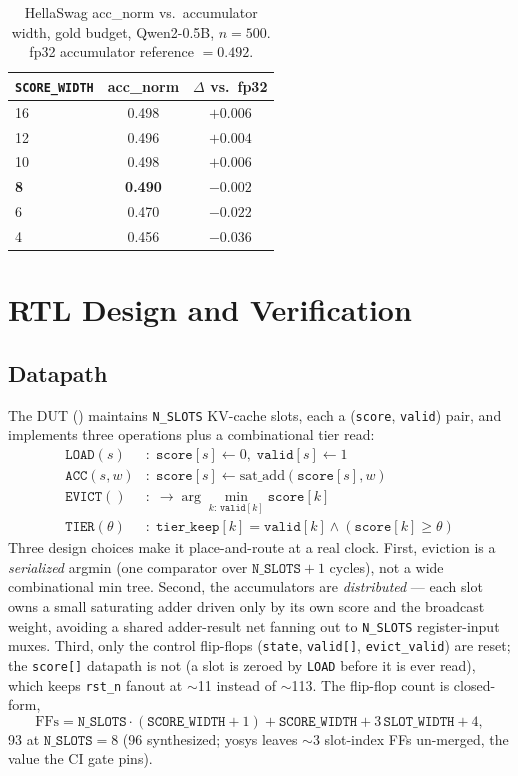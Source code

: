 \documentclass[10pt,twocolumn]{article}
\begin{document}
\begin{table}[tbp]
\centering
\caption{HellaSwag acc\_norm vs.\ accumulator width, gold budget,
  Qwen2-0.5B, $n{=}500$. fp32 accumulator reference $= 0.492$.}
\label{tab:scorewidth}
\small
\begin{tabular}{lcc}
\toprule
\texttt{SCORE\_WIDTH} & acc\_norm & $\Delta$ vs.\ fp32 \\
\midrule
16 & 0.498 & $+0.006$ \\
12 & 0.496 & $+0.004$ \\
10 & 0.498 & $+0.006$ \\
\textbf{8} & \textbf{0.490} & $\mathbf{-0.002}$ \\
6  & 0.470 & $-0.022$ \\
4  & 0.456 & $-0.036$ \\
\bottomrule
\end{tabular}
\end{table}

\section{RTL Design and Verification}
\label{sec:rtl}

\subsection{Datapath}

The DUT () maintains \texttt{N\_SLOTS}
KV-cache slots, each a (\texttt{score}, \texttt{valid}) pair, and implements three
operations plus a combinational tier read:
\begin{align*}
\texttt{LOAD}(s)   &:\; \texttt{score}[s]\leftarrow0,\;\texttt{valid}[s]\leftarrow1 \\
\texttt{ACC}(s, w) &:\; \texttt{score}[s]\leftarrow\mathrm{sat\_add}(\texttt{score}[s], w) \\
\texttt{EVICT}()   &:\; \rightarrow\arg\min_{k:\,\texttt{valid}[k]}\texttt{score}[k] \\
\texttt{TIER}(\theta) &:\; \texttt{tier\_keep}[k]=\texttt{valid}[k]\wedge(\texttt{score}[k]\ge\theta)
\end{align*}
Three design choices make it place-and-route at a real clock. First, eviction is a
\emph{serialized} argmin (one comparator over $\texttt{N\_SLOTS}+1$ cycles), not a
wide combinational min tree. Second, the accumulators are \emph{distributed} ---
each slot owns a small saturating adder driven only by its own score and the
broadcast weight, avoiding a shared adder-result net fanning out to
\texttt{N\_SLOTS} register-input muxes. Third, only the control flip-flops
(\texttt{state}, \texttt{valid[]}, \texttt{evict\_valid}) are reset; the
\texttt{score[]} datapath is not (a slot is zeroed by \texttt{LOAD} before it is
ever read), which keeps \texttt{rst\_n} fanout at $\sim$11 instead of $\sim$113.
The flip-flop count is closed-form,
\[
  \mathrm{FFs}=\texttt{N\_SLOTS}\cdot(\texttt{SCORE\_WIDTH}{+}1)+\texttt{SCORE\_WIDTH}+3\,\texttt{SLOT\_WIDTH}+4,
\]
93 at $\texttt{N\_SLOTS}{=}8$ (96 synthesized; yosys leaves $\sim$3 slot-index FFs
un-merged, the value the CI gate pins).
\end{document}

